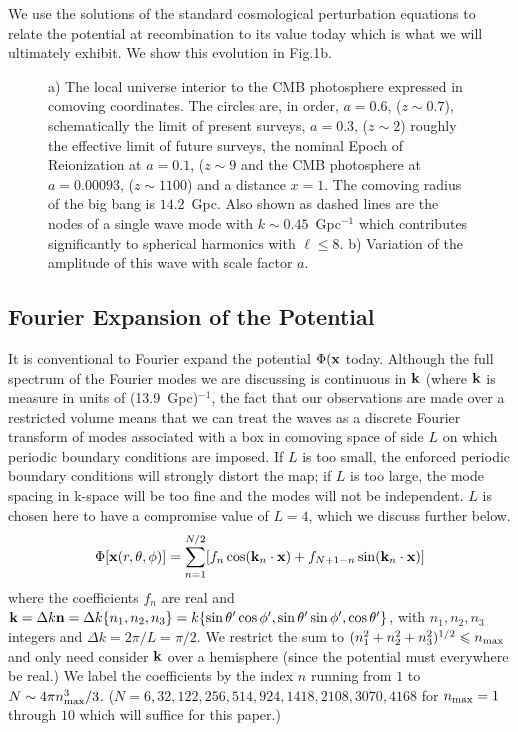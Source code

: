 \documentclass[useAMS,usenatbib,a4paper]{mn2e}
\begin{document}
We use the solutions of the standard cosmological perturbation equations to relate the potential at recombination to its value today which is what we will ultimately exhibit. We show this evolution in Fig.1b.
\begin{figure}[t]
\centering
\caption{\small{a) The local universe interior to the CMB photosphere expressed in comoving coordinates. The circles are, in order, $a=0.6$, ($z\sim0.7$), schematically the limit of present surveys, $a=0.3$, ($z\sim2$) roughly the effective limit of future surveys, the nominal Epoch of Reionization at $a=0.1$, ($z\sim9$ and the CMB photosphere at $a=0.00093$, ($z\sim1100$) and a distance $x=1$. The comoving radius of the big bang is $14.2$~Gpc. Also shown as dashed lines are the nodes of a single wave mode with $k\sim0.45$~Gpc$^{-1}$ which contributes significantly to spherical harmonics with $\ell\leq8$. b) Variation of the amplitude of this wave with scale factor $a$.}}
\end{figure}
\subsection{Fourier Expansion of the Potential}
It is conventional to Fourier expand the potential $\Phi({\bf x}$ today. Although the full spectrum of the Fourier modes we are discussing is continuous in ${\bf k}$ (where $\bf k$ is measure in units of (13.9~Gpc)$^{-1}$, the fact that our observations are made over a restricted volume means that we can treat the waves as a discrete Fourier transform of modes associated with a box in comoving space of side $L$ on which periodic boundary conditions are imposed. If $L$ is too small, the enforced periodic boundary conditions will strongly distort the map; if $L$ is too large, the mode spacing in k-space will be too fine and the modes will not be independent. $L$ is chosen here to have a compromise value of $L=4$, which we discuss further below.
\begin{equation}
\Phi[{\bf x}(r,\theta,\phi)]=\sum_{n=1}^{N/2}[f_n\cos({\bf k}_n\cdot{\bf x})+f_{N+1-n}\sin({\bf k}_n\cdot{\bf x})]
\end{equation}
where the coefficients $f_n$ are real and ${\bf k}=\Delta k{\bf n}=\Delta k\{n_1,n_2,n_3\}=k\{\sin\theta'\cos\phi',\sin\theta'\sin\phi',\cos\theta'\}$, with $n_1,n_2,n_3$ integers and $\Delta k=2\pi/L=\pi/2$.  We restrict the sum to $(n_1^2+n_2^2+n_3^2)^{1/2}\le n_{\rm max}$ and only need consider $\bf k$ over a hemisphere (since the potential must everywhere be real.) We label the coefficients by the index $n$ running from $1$ to $N\sim4\pi n_{\rm max}^3/3$. ($N=6,32,122,256,514,924,1418,2108,3070,4168$ for $n_{\rm max}=1$ through $10$ which will suffice for this paper.)
\end{document}
